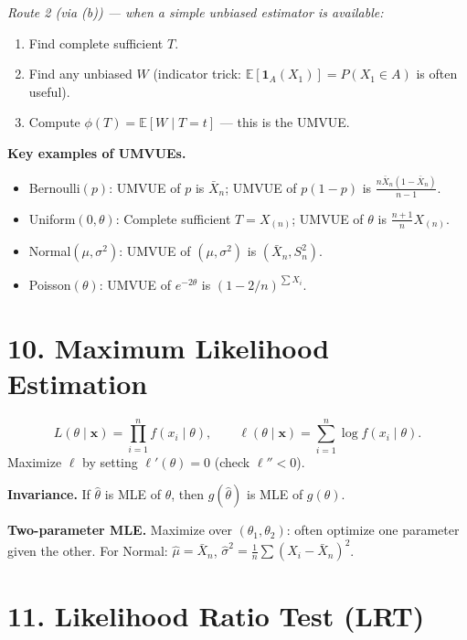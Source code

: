 \documentclass[11pt]{article}
\newcommand{\bbE}{\mathbb{E}}
\begin{document}
\noindent\textit{Route 2 (via (b)) — when a simple unbiased estimator is available:}
\begin{enumerate}
  \item Find complete sufficient $T$.
  \item Find any unbiased $W$ (indicator trick: $\bbE[\mathbf{1}_A(X_1)]=P(X_1\in A)$
    is often useful).
  \item Compute $\phi(T)=\bbE[W\mid T=t]$ — this is the UMVUE.
\end{enumerate}

\medskip
\noindent\textbf{Key examples of UMVUEs.}
\begin{itemize}
  \item Bernoulli$(p)$: UMVUE of $p$ is $\bar X_n$; UMVUE of $p(1-p)$
    is $\frac{n\bar X_n(1-\bar X_n)}{n-1}$.
  \item Uniform$(0,\theta)$: Complete sufficient $T=X_{(n)}$; UMVUE
    of $\theta$ is $\frac{n+1}{n}X_{(n)}$.
  \item Normal$(\mu,\sigma^2)$: UMVUE of $(\mu,\sigma^2)$ is $(\bar
    X_n, S_n^2)$.
  \item Poisson$(\theta)$: UMVUE of $e^{-2\theta}$ is $(1-2/n)^{\sum X_i}$.
\end{itemize}

\section*{10.\; Maximum Likelihood Estimation}

\[
  L(\theta\mid\mathbf{x}) = \prod_{i=1}^n f(x_i\mid\theta), \qquad
  \ell(\theta\mid\mathbf{x}) = \sum_{i=1}^n \log f(x_i\mid\theta).
\]
Maximize $\ell$ by setting $\ell'(\theta)=0$ (check $\ell''<0$).

\medskip
\textbf{Invariance.} If $\hat\theta$ is MLE of $\theta$, then
$g(\hat\theta)$ is MLE of $g(\theta)$.

\medskip
\textbf{Two-parameter MLE.} Maximize over $(\theta_1,\theta_2)$:
often optimize one parameter given the other.
For Normal: $\hat\mu=\bar X_n$, $\hat\sigma^2=\frac{1}{n}\sum(X_i-\bar X_n)^2$.

\section*{11.\; Likelihood Ratio Test (LRT)}
\end{document}
